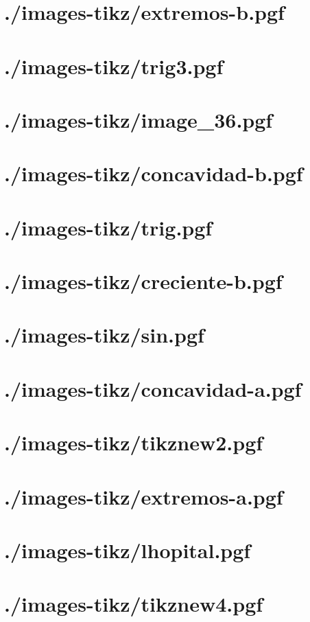 \documentclass[]{article}
\begin{document}
\section{./images-tikz/extremos-b.pgf} 
\section{./images-tikz/trig3.pgf} 
\section{./images-tikz/image_36.pgf} 
\section{./images-tikz/concavidad-b.pgf} 
\section{./images-tikz/trig.pgf} 
\section{./images-tikz/creciente-b.pgf} 
\section{./images-tikz/sin.pgf} 
\section{./images-tikz/concavidad-a.pgf} 
\section{./images-tikz/tikznew2.pgf} 
\section{./images-tikz/extremos-a.pgf} 
\section{./images-tikz/lhopital.pgf} 
\section{./images-tikz/tikznew4.pgf} 
\end{document}
